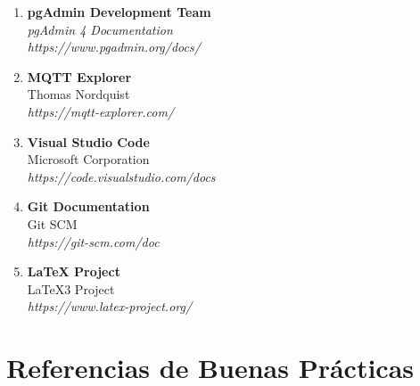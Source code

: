\begin{enumerate}

    \item \textbf{pgAdmin Development Team} \\
    \textit{pgAdmin 4 Documentation} \\
    \textit{https://www.pgadmin.org/docs/}

    \item \textbf{MQTT Explorer} \\
    Thomas Nordquist \\
    \textit{https://mqtt-explorer.com/}

    \item \textbf{Visual Studio Code} \\
    Microsoft Corporation \\
    \textit{https://code.visualstudio.com/docs}

    \item \textbf{Git Documentation} \\
    Git SCM \\
    \textit{https://git-scm.com/doc}

    \item \textbf{LaTeX Project} \\
    LaTeX3 Project \\
    \textit{https://www.latex-project.org/}

\end{enumerate}

\section{Referencias de Buenas Prácticas}

